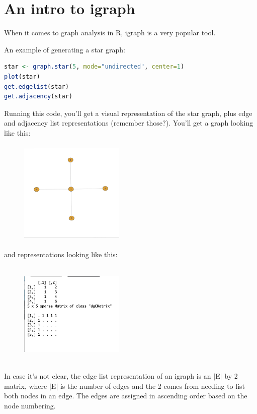 \section{An intro to igraph}

When it comes to graph analysis in R, igraph is a very popular tool.

An example of generating a star graph:

\begin{lstlisting}[language=R]
star <- graph.star(5, mode="undirected", center=1)
plot(star)
get.edgelist(star)
get.adjacency(star)
\end{lstlisting}

Running this code, you'll get a visual representation of the star graph, plus edge and adjacency list representations (remember those?). You'll get a graph looking like this:

\begin{figure}[h]
\includegraphics[width=5cm, height=5cm]{figures/star.png}
\centering
\end{figure}

and representations looking like this:

\begin{figure}[h]
\includegraphics[width=5cm, height=5cm]{figures/graph_rep.png}
\centering
\end{figure}

In case it's not clear, the edge list representation of an igraph is an $|$E$|$ by 2 matrix, where $|$E$|$ is the number of edges and the 2 comes from needing to list both nodes in an edge. The edges are assigned in ascending order based on the node numbering.

